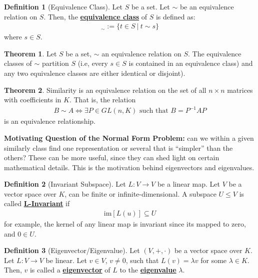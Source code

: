 \documentclass[11pt]{scrartcl}
\theoremstyle{definition}
\newtheorem{theorem}{Theorem}
\newtheorem{definition}{Definition}
\theoremstyle{remark}
\newcommand{\dfn}[1]{\textbf{\underline{#1}}}
\newcommand{\image}[1]{\text{im}[#1]}
\newcommand{\vsok}[0]{Let $(V, +, \cdot)$ be a vector space over $K$}
\begin{document}
\begin{definition}[Equivalence Class]
	Let $S$ be a set. Let $\sim$ be an equivalence relation on $S$. Then, the \dfn{equivalence class} of $S$ is defined as: 
	\begin{align}
		[s]_{\sim} := \{ t \in S\ |\ t \sim s \} 	
	\end{align}
	where $s \in S$. 
\end{definition}

\begin{theorem}
	Let $S$ be a set, $\sim$ an equivalence relation on $S$. The equivalence classes of $\sim$ partition $S$ (i.e, every $s \in S$ is contained in an equivalence class) and any two equivalence classes are either identical or disjoint). 
\end{theorem}

\begin{theorem}
	Similarity is an equivalence relation on the set of all $n \times n$ matrices with coefficients in $K$. That is, the relation
	\begin{align}	
		B \sim A \iff \exists P \in GL(n, K) \text{ such that } B = P^{-1}AP 	
	\end{align}
	is an equivalence relationship. 
\end{theorem}

\textbf{Motivating Question of the Normal Form Problem:} can we within a given similarly class find  one representation or several that is ``simpler'' than the others? These can be more useful, since they can shed light on certain mathematical details. This is the motivation behind eigenvectors and eigenvalues. 

\begin{definition}[Invariant Subspace]
	Let $L: V \rightarrow V$ be a linear map. Let $V$ be a vector space over $K$, can be finite or infinite-dimensional. A subspace $U \leq V$ is called \dfn{L-Invariant} if 
	\begin{align}
		\image{L(u)} \subseteq U 	
	\end{align}
	for example, the kernel of any linear map is invariant since its mapped to zero, and $0 \in U$. 
\end{definition}

\begin{definition}[Eigenvector/Eigenvalue]
	\vsok. Let $L: V \rightarrow V$ be linear. Let $ v \in V$, $v \neq 0$,  such that $L(v) = \lambda v$ for some $\lambda \in K$. Then, $v$ is called a \dfn{eigenvector} of $L$ to the \dfn{eigenvalue} $\lambda$. 
\end{definition}
\end{document}
